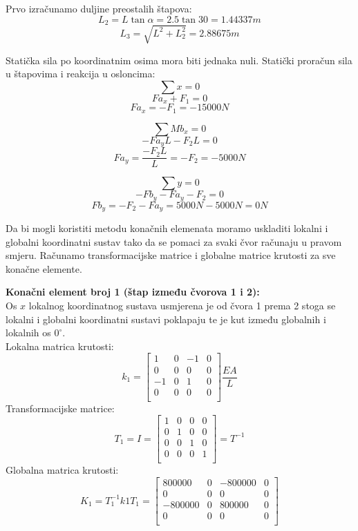 \documentclass[a4paper,twoside,12pt]{memoir} %
\begin{document}
Prvo izračunamo duljine preostalih štapova:
$$ L_2 = L  \tan{\alpha} = 2.5  \tan{30} = 1.44337 m$$
$$ L_3 = \sqrt{L^2 + L^2_2} = 2.88675 m $$

Statička sila po koordinatnim osima mora biti jednaka nuli.
Statički proračun sila u štapovima i reakcija u osloncima:
$$ \sum x = 0 $$
$$ Fa_x + F_1 = 0 $$
$$ Fa_x = -F_1 = -15000 N $$
\newline

$$ \sum Mb_x = 0 $$
$$ -Fa_y  L - F_2  L = 0 $$
$$ Fa_y = \frac{-F_2  L}{L} = -F_2 = -5000 N $$
\newline

$$ \sum y = 0 $$
$$ -Fb_y - Fa_y - F_2 = 0 $$
$$ Fb_y = -F_2 - Fa_y = 5000 N - 5000 N = 0 N $$
\newline


Da bi mogli koristiti metodu konačnih elemenata moramo uskladiti lokalni i globalni koordinatni sustav tako da se pomaci za svaki čvor računaju u pravom smjeru. Računamo transformacijske matrice i globalne matrice krutosti za sve konačne elemente. \par

\textbf{Konačni element broj 1 (štap između čvorova 1 i 2):} \\
Os $x$ lokalnog koordinatnog sustava usmjerena je od čvora 1 prema 2 stoga se lokalni i globalni koordinatni sustavi poklapaju te je kut između globalnih i lokalnih os $0^\circ$. \\
Lokalna matrica krutosti:
\begin{equation}
    k_1 = 
    \begin{bmatrix}
    1 & 0 & -1 & 0 \\
    0 & 0 & 0 & 0 \\
    -1 & 0 & 1 & 0 \\
    0 & 0 & 0 & 0 \\
    \end{bmatrix}  \frac{E  A}{L}
\end{equation}
Transformacijske matrice:
\begin{equation}
    T_1 = I =
    \begin{bmatrix}
    1 & 0 & 0 & 0 \\
    0 & 1 & 0 & 0 \\
    0 & 0 & 1 & 0 \\
    0 & 0 & 0 & 1 \\
    \end{bmatrix} = T^{-1}
\end{equation}
Globalna matrica krutosti:
\begin{equation}
    K_1 = T^{-1}_1  k1  T_1 =
    \begin{bmatrix}
    800000 & 0 & -800000 & 0 \\
    0 & 0 & 0 & 0 \\
    -800000 & 0 & 800000 & 0 \\
    0 & 0 & 0 & 0 \\
    \end{bmatrix}
\end{equation}
\end{document}
